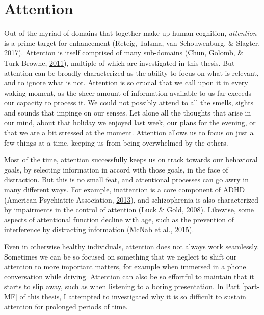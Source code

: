 \documentclass[12pt,a4paper,]{memoir}
\begin{document}
\hypertarget{attention}{%
\section{Attention}\label{attention}}

Out of the myriad of domains that together make up human cognition, \emph{attention} is a prime target for enhancement (Reteig, Talsma, van Schouwenburg, \& Slagter, \protect\hyperlink{ref-Reteig2017}{2017}). Attention is itself comprised of many sub-domains (Chun, Golomb, \& Turk-Browne, \protect\hyperlink{ref-Chun2011}{2011}), multiple of which are investigated in this thesis. But attention can be broadly characterized as the ability to focus on what is relevant, and to ignore what is not. Attention is so crucial that we call upon it in every waking moment, as the sheer amount of information available to us far exceeds our capacity to process it. We could not possibly attend to all the smells, sights and sounds that impinge on our senses. Let alone all the thoughts that arise in our mind, about that holiday we enjoyed last week, our plans for the evening, or that we are a bit stressed at the moment. Attention allows us to focus on just a few things at a time, keeping us from being overwhelmed by the others.

Most of the time, attention successfully keeps us on track towards our behavioral goals, by selecting information in accord with those goals, in the face of distraction. But this is no small feat, and attentional processes can go awry in many different ways. For example, inattention is a core component of ADHD (American Psychiatric Association, \protect\hyperlink{ref-AmericanPsychiatricAssociation2013}{2013}), and schizophrenia is also characterized by impairments in the control of attention (Luck \& Gold, \protect\hyperlink{ref-Luck2008}{2008}). Likewise, some aspects of attentional function decline with age, such as the prevention of interference by distracting information (McNab et al., \protect\hyperlink{ref-McNab2015}{2015}).

Even in otherwise healthy individuals, attention does not always work seamlessly. Sometimes we can be so focused on something that we neglect to shift our attention to more important matters, for example when immersed in a phone conversation while driving. Attention can also be so effortful to maintain that it starts to slip away, such as when listening to a boring presentation. In Part \ref{part-MF} of this thesis, I attempted to investigated why it is so difficult to sustain attention for prolonged periods of time.
\end{document}
